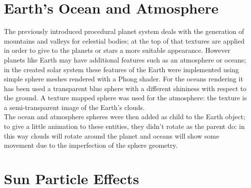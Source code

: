 \documentclass[paper=a4, fontsize=11pt]{scrartcl} %
\numberwithin{equation}{section} %
\numberwithin{figure}{section} %
\numberwithin{table}{section} %
\theoremstyle{definition}
\begin{document}

\section{Earth's Ocean and Atmosphere}

The previously introduced procedural planet system deals with the generation of mountains and valleys for celestial bodies; at the top of that textures are applied in order to give to the planets or stars a more suitable appearance. However planets like Earth may have additional features such as an atmosphere or oceans; in the created solar system these features of the Earth were implemented using simple sphere meshes rendered with a Phong shader. For the oceans rendering it has been used a transparent blue sphere with a different shininess with respect to the ground. A texture mapped sphere was used for the atmosphere: the texture is a semi-transparent image of the Earth's clouds.\\
The ocean and atmosphere spheres were then added as child to the Earth object; to give a little animation to these entities, they didn't rotate as the parent do: in this way clouds will rotate around the planet and oceans will show some movement due to the imperfection of the sphere geometry.


\section{Sun Particle Effects}
\end{document}
